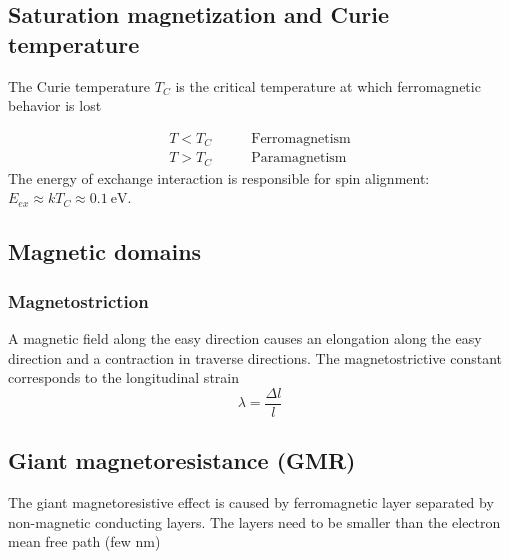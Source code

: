 \subsection{Saturation magnetization and Curie temperature}
The Curie temperature $T_C$ is the critical temperature at which ferromagnetic behavior is lost

\begin{align*}
    T < T_C \qquad &\text{Ferromagnetism} \\
    T > T_C \qquad & \text{Paramagnetism}
\end{align*}
The energy of exchange interaction is responsible for spin alignment:
$ E_{ex} \approx k T_C \approx \SI{0.1}{\electronvolt}$.

\subsection{Magnetic domains}
\subsubsection{Magnetostriction}
A magnetic field along the easy direction causes an elongation along 
the easy direction and a contraction in traverse directions.
The magnetostrictive constant corresponds to the longitudinal strain
\begin{equation}
    \lambda = \frac{\Delta l}{l}
\end{equation}

\subsection{Giant magnetoresistance (GMR)}
The giant magnetoresistive effect is caused by ferromagnetic layer
separated by non-magnetic conducting layers.
The layers need to be smaller than the electron mean free path (few nm)

